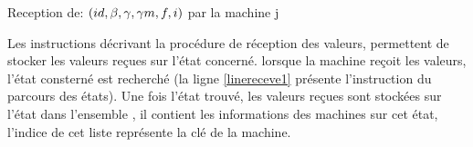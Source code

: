 \begin{procedure}[H]
\setcounter{AlgoLine}{0}	
\SetAlgoLined
\LinesNumbered
  \caption{Reception de: $(id,\beta{},\gamma{},\gamma m{},f,i)$ par la machine j}
\end{procedure}

Les instructions décrivant la procédure de réception des valeurs, permettent de stocker les valeurs reçues sur l'état concerné. lorsque la machine reçoit les valeurs, l'état consterné est recherché (la ligne \ref{linereceve1} présente l'instruction du parcours des états). Une fois l'état trouvé, les valeurs reçues sont stockées sur l'état dans l'ensemble , il contient les informations des machines sur cet état, l'indice de cet liste représente la clé de la machine. 

